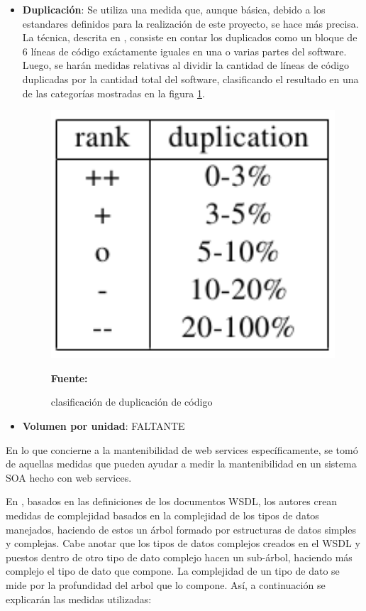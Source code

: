 \begin{itemize}
 \item \textbf{Duplicación}: Se utiliza una medida que, aunque básica, debido a los estandares definidos para la realización de este proyecto, se hace más precisa. La técnica, descrita en \cite{measuring_maintainability}, consiste en contar los duplicados como un bloque de 6 líneas de código exáctamente iguales en una o varias partes del software. Luego, se harán medidas relativas al dividir la cantidad de líneas de código duplicadas por la cantidad total del software, clasificando el resultado en una de las categorías mostradas en la figura \ref{fig:mantainability4}.

\begin{figure}[!htb]
  \begin{center}
    \includegraphics[width=11cm]{./imagenes/mantainability4.png}
    \caption{clasificación de duplicación de código}
    \label{fig:mantainability4}
    \textbf{Fuente:}  \cite{measuring_maintainability}
  \end{center}
\end{figure}

 \item \textbf{Volumen por unidad}: FALTANTE

\end{itemize}

En lo que concierne a la mantenibilidad de web services específicamente, se tomó de \cite{complexity_mesure} aquellas medidas que pueden ayudar a medir la mantenibilidad en un sistema SOA hecho con web services. 

En \cite{complexity_mesure}, basados en las definiciones de los documentos WSDL, los autores crean medidas de complejidad basados en la complejidad de los tipos de datos manejados, haciendo de estos un árbol formado por estructuras de datos simples y complejas. Cabe anotar que los tipos de datos complejos creados en el WSDL y puestos dentro de otro tipo de dato complejo hacen un sub-árbol, haciendo más complejo el tipo de dato que compone. La complejidad de un tipo de dato se mide por la profundidad del arbol que lo compone. Así, a continuación se explicarán las medidas utilizadas:


